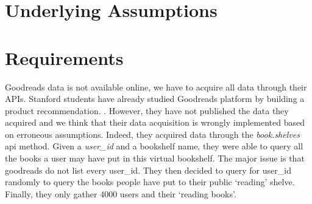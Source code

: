 \documentclass[12pt]{article}
\begin{document}
\section{Underlying Assumptions}
\section{Requirements}

Goodreads data is not available online, we have to acquire all data through their APIs. Stanford students have already studied Goodreads platform by building a product recommendation. \cite{stanford:goodreads}. However, they have not published the data they acquired and we think that their data acquisition is wrongly implemented based on erroneous assumptions. Indeed, they acquired data through the \textit{book.shelves} api method. Given a \textit{user_id} and a bookshelf name, they were able to query all the books a user may have put in this virtual bookshelf. The major issue is that goodreads do not list every user_id. They then decided to query for user_id randomly to query the books people have put to their public `reading' shelve. Finally, they only gather 4000 users and their `reading books'.
\end{document}
